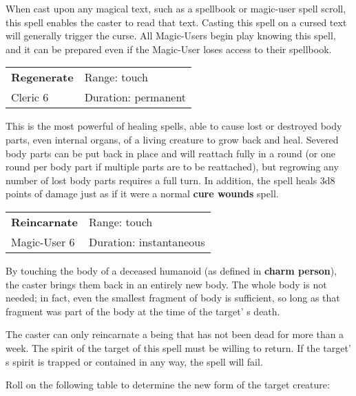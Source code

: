 \documentclass[a4paper,twoside,openany,10pt]{book}
\begin{document}
\begin{multicols}{2}
When cast upon any magical text, such as a spellbook or magic-user spell scroll, this spell enables the caster to read that text. Casting this spell on a cursed text will generally trigger the curse. All Magic-Users begin play knowing this spell, and it can be prepared even if the Magic-User loses access to their spellbook.

\smallskip\begin{flushleft} 
	\begin{tabularx}{0.45\textwidth}{@{}m{3.5cm}m{5.5cm}@{}} 
		\textbf{Regenerate} & Range: touch\\
Cleric 6 & Duration: permanent\\
	\end{tabularx}\end{flushleft}

This is the most powerful of healing spells, able to cause lost or destroyed body parts, even internal organs, of a living creature to grow back and heal. Severed body parts can be put back in place and will reattach fully in a round (or one round per body part if multiple parts are to be reattached), but regrowing any number of lost body parts requires a full turn. In addition, the spell heals 3d8 points of damage just as if it were a normal \textbf{cure wounds} spell.

\smallskip\begin{flushleft} 
	\begin{tabularx}{0.45\textwidth}{@{}m{3.5cm}m{5.5cm}@{}} 
		\textbf{Reincarnate} & Range: touch\\
Magic-User 6 & Duration: instantaneous\\
	\end{tabularx}\end{flushleft}

By touching the body of a deceased humanoid (as defined in \textbf{charm person}), the caster brings them back in an entirely new body. The whole body is not needed; in fact, even the smallest fragment of body is sufficient, so long as that fragment was part of the body at the time of the target' s death.

The caster can only reincarnate a being that has not been dead for more than a week. The spirit of the target of this spell must be willing to return. If the target' s spirit is trapped or contained in any way, the spell will fail.

Roll on the following table to determine the new form of the target creature:\\


\end{multicols}
\end{document}
